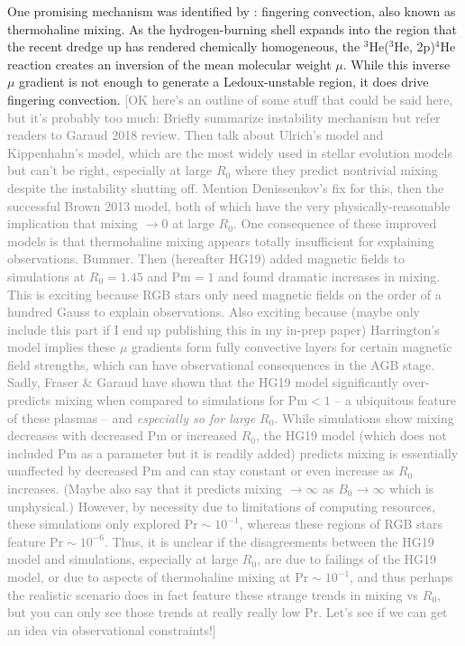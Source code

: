One promising mechanism was identified by \citet{charbonnel_thermohaline_2007}: fingering convection, also known as thermohaline mixing. As the hydrogen-burning shell expands into the region that the recent dredge up has rendered chemically homogeneous, the $^3$He($^3$He, 2p)$^4$He reaction creates an inversion of the mean molecular weight $\mu$. While this inverse $\mu$ gradient is not enough to generate a Ledoux-unstable region, it does drive fingering convection. \textcolor{gray}{[OK here's an outline of some stuff that could be said here, but it's probably too much: Briefly summarize instability mechanism but refer readers to Garaud 2018 review. Then talk about Ulrich's model and Kippenhahn's model, which are the most widely used in stellar evolution models but can't be right, especially at large $R_0$ where they predict nontrivial mixing despite the instability shutting off. Mention Denissenkov's fix for this, then the successful Brown 2013 model, both of which have the very physically-reasonable implication that mixing $\to 0$ at large $R_0$. One consequence of these improved models is that thermohaline mixing appears totally insufficient for explaining observations. Bummer. Then \citet{harrington} (hereafter HG19) added magnetic fields to simulations at $R_0 = 1.45$ and $\mathrm{Pm} = 1$ and found dramatic increases in mixing. This is exciting because RGB stars only need magnetic fields on the order of a hundred Gauss to explain observations. Also exciting because (maybe only include this part if I end up publishing this in my in-prep paper) Harrington's model implies these $\mu$ gradients form fully convective layers for certain magnetic field strengths, which can have observational consequences in the AGB stage. Sadly, Fraser \& Garaud have shown that the HG19 model significantly over-predicts mixing when compared to simulations for $\mathrm{Pm} < 1$ -- a ubiquitous feature of these plasmas -- and \textit{especially so for large $R_0$}. While simulations show mixing decreases with decreased $\mathrm{Pm}$ or increased $R_0$, the HG19 model (which does not included $\mathrm{Pm}$ as a parameter but it is readily added) predicts mixing is essentially unaffected by decreased $\mathrm{Pm}$ and can stay constant or even increase as $R_0$ increases. (Maybe also say that it predicts mixing $\to \infty$ as $B_0 \to \infty$ which is unphysical.) However, by necessity due to limitations of computing resources, these simulations only explored $\mathrm{Pr} \sim 10^{-1}$, whereas these regions of RGB stars feature $\mathrm{Pr} \sim 10^{-6}$. Thus, it is unclear if the disagreements between the HG19 model and simulations, especially at large $R_0$, are due to failings of the HG19 model, or due to aspects of thermohaline mixing at $\mathrm{Pr} \sim 10^{-1}$, and thus perhaps the realistic scenario does in fact feature these strange trends in mixing vs $R_0$, but you can only see those trends at really really low $\mathrm{Pr}$. Let's see if we can get an idea via observational constraints!]}


